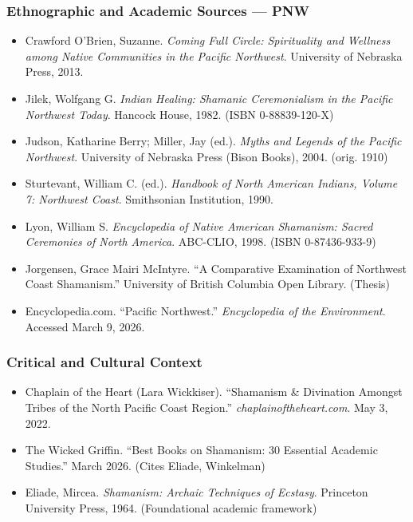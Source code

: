 \documentclass[11pt,letterpaper]{article}
\begin{document}
\subsubsection{Ethnographic and Academic Sources --- PNW}

\begin{itemize}[noitemsep]
  \item Crawford O'Brien, Suzanne. \emph{Coming Full Circle: Spirituality and Wellness among Native Communities in the Pacific Northwest}. University of Nebraska Press, 2013.
  \item Jilek, Wolfgang G. \emph{Indian Healing: Shamanic Ceremonialism in the Pacific Northwest Today}. Hancock House, 1982. (ISBN 0-88839-120-X)
  \item Judson, Katharine Berry; Miller, Jay (ed.). \emph{Myths and Legends of the Pacific Northwest}. University of Nebraska Press (Bison Books), 2004. (orig. 1910)
  \item Sturtevant, William C. (ed.). \emph{Handbook of North American Indians, Volume 7: Northwest Coast}. Smithsonian Institution, 1990.
  \item Lyon, William S. \emph{Encyclopedia of Native American Shamanism: Sacred Ceremonies of North America}. ABC-CLIO, 1998. (ISBN 0-87436-933-9)
  \item Jorgensen, Grace Mairi McIntyre. ``A Comparative Examination of Northwest Coast Shamanism.'' University of British Columbia Open Library. (Thesis)
  \item Encyclopedia.com. ``Pacific Northwest.'' \emph{Encyclopedia of the Environment}. Accessed March 9, 2026.
\end{itemize}

\subsubsection{Critical and Cultural Context}

\begin{itemize}[noitemsep]
  \item Chaplain of the Heart (Lara Wickkiser). ``Shamanism \& Divination Amongst Tribes of the North Pacific Coast Region.'' \emph{chaplainoftheheart.com}. May 3, 2022.
  \item The Wicked Griffin. ``Best Books on Shamanism: 30 Essential Academic Studies.'' March 2026. (Cites Eliade, Winkelman)
  \item Eliade, Mircea. \emph{Shamanism: Archaic Techniques of Ecstasy}. Princeton University Press, 1964. (Foundational academic framework)
\end{itemize}
\end{document}
